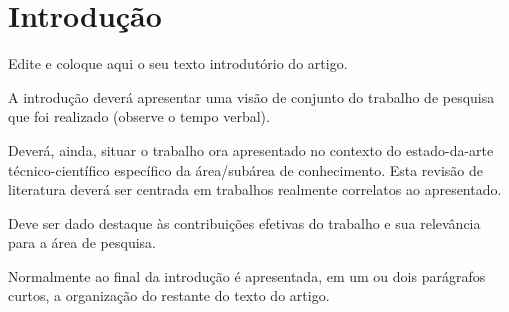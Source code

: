 


\section{Introdução}\label{sec:introducao}




Edite e coloque aqui o seu texto introdutório do artigo.

A introdução deverá apresentar uma visão de conjunto do trabalho de pesquisa que foi realizado (observe o tempo verbal).

Deverá, ainda, situar o trabalho ora apresentado no contexto do estado-da-arte técnico-científico específico da área/subárea de conhecimento. Esta revisão de literatura deverá ser centrada em trabalhos realmente correlatos ao apresentado.

Deve ser dado destaque às contribuições efetivas do trabalho e sua relevância para a área de pesquisa.

Normalmente ao final da introdução é apresentada, em um ou dois parágrafos curtos, a organização do restante do texto do artigo.
